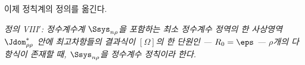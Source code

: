 
이제 정칙계의 정의를 옮긴다.

\emph{정의 VIII$'$: 정수계수계 $\Ssys_{n\rho}$을 포함하는 최소 정수계수 정역의 한 사상영역 $\Jdom^*_{\rho\rho}$ 안에 최고차항들의 결과식이 $[\Omega]$의 한 단원인 --- $R_0=\eps$ --- $\rho$개의 다항식이 존재할 때, $\Ssys_{n\rho}$을 정수계수 정칙이라 한다.}
